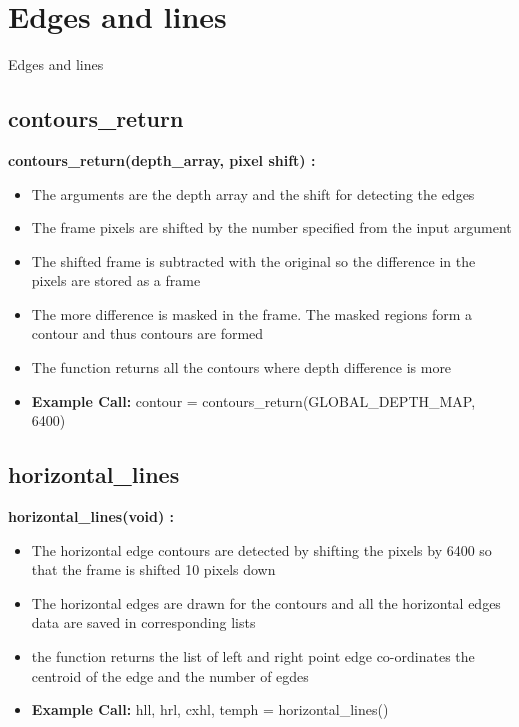 \documentclass[10pt, a4paper]{beamer}
\begin{document}
\section{Edges and lines}
\begin{frame}[allowframebreaks]{Edges and lines}
  \subsection{contours\_return}
    \textbf{contours\_return(depth\_array, pixel shift) : }
      \begin{itemize}
       \item The arguments are the depth array and the shift for detecting the edges
       \item The frame pixels are shifted by the number specified from the input argument
       \item The shifted frame is subtracted with the original so the difference in the pixels are stored as a frame
       \item The more difference is masked in the frame. The masked regions form a contour and thus contours are formed
       \item The function returns all the contours where depth difference is more
       \item \textbf{Example Call:} contour = contours\_return(GLOBAL\_DEPTH\_MAP, 6400)
      \end{itemize}
\framebreak
  \subsection{horizontal\_lines}
    \textbf{horizontal\_lines(void) : }
      \begin{itemize}
       \item The horizontal edge contours are detected by shifting the pixels by 6400 so that the frame is shifted 10 pixels down
       \item The horizontal edges are drawn for the contours and all the horizontal edges data are saved in corresponding lists
       \item the function returns the list of left and right point edge co-ordinates the centroid of the edge and the number of egdes
       \item \textbf{Example Call:} hll, hrl, cxhl, temph = horizontal\_lines()
      \end{itemize}
\framebreak

\end{frame}
\end{document}
